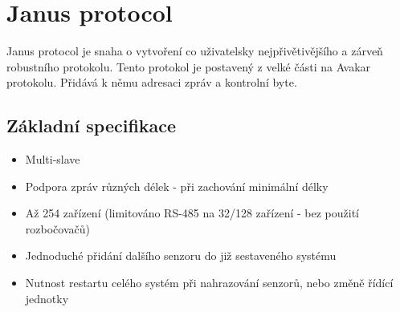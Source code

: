 \chapter{Janus protocol}
Janus protocol je snaha o vytvoření co uživatelsky nejpřivětivějšího a zárveň robustního protokolu.
Tento protokol je postavený z velké části na Avakar protokolu.
Přidává k němu adresaci zpráv a kontrolní byte.

\section{Základní specifikace}
\begin{itemize}
    \item Multi-slave
    \item Podpora zpráv různých délek - při zachování minimální délky
    \item Až 254 zařízení (limitováno RS-485 na 32/128 zařízení - bez použití rozbočovačů)
    \item Jednoduché přidání dalšího senzoru do již sestaveného systému
    \item Nutnost restartu celého systém při nahrazování senzorů, nebo změně řídící jednotky
\end{itemize}